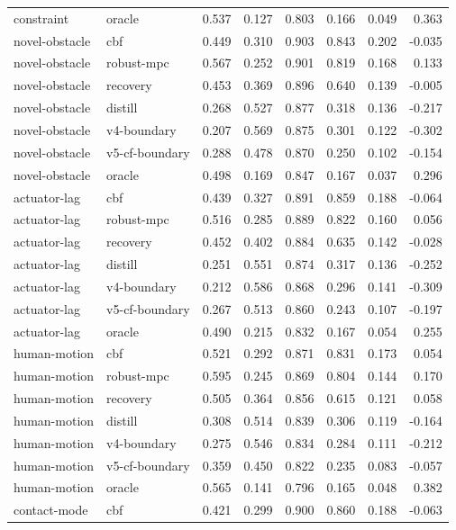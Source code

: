 \documentclass{article}
\begin{document}
\begin{longtable}{@{}llrrrrrr@{}}
constraint & oracle & 0.537 & 0.127 & 0.803 & 0.166 & 0.049 & 0.363 \\
novel-obstacle & cbf & 0.449 & 0.310 & 0.903 & 0.843 & 0.202 & -0.035 \\
novel-obstacle & robust-mpc & 0.567 & 0.252 & 0.901 & 0.819 & 0.168 & 0.133 \\
novel-obstacle & recovery & 0.453 & 0.369 & 0.896 & 0.640 & 0.139 & -0.005 \\
novel-obstacle & distill & 0.268 & 0.527 & 0.877 & 0.318 & 0.136 & -0.217 \\
novel-obstacle & v4-boundary & 0.207 & 0.569 & 0.875 & 0.301 & 0.122 & -0.302 \\
novel-obstacle & v5-cf-boundary & 0.288 & 0.478 & 0.870 & 0.250 & 0.102 & -0.154 \\
novel-obstacle & oracle & 0.498 & 0.169 & 0.847 & 0.167 & 0.037 & 0.296 \\
actuator-lag & cbf & 0.439 & 0.327 & 0.891 & 0.859 & 0.188 & -0.064 \\
actuator-lag & robust-mpc & 0.516 & 0.285 & 0.889 & 0.822 & 0.160 & 0.056 \\
actuator-lag & recovery & 0.452 & 0.402 & 0.884 & 0.635 & 0.142 & -0.028 \\
actuator-lag & distill & 0.251 & 0.551 & 0.874 & 0.317 & 0.136 & -0.252 \\
actuator-lag & v4-boundary & 0.212 & 0.586 & 0.868 & 0.296 & 0.141 & -0.309 \\
actuator-lag & v5-cf-boundary & 0.267 & 0.513 & 0.860 & 0.243 & 0.107 & -0.197 \\
actuator-lag & oracle & 0.490 & 0.215 & 0.832 & 0.167 & 0.054 & 0.255 \\
human-motion & cbf & 0.521 & 0.292 & 0.871 & 0.831 & 0.173 & 0.054 \\
human-motion & robust-mpc & 0.595 & 0.245 & 0.869 & 0.804 & 0.144 & 0.170 \\
human-motion & recovery & 0.505 & 0.364 & 0.856 & 0.615 & 0.121 & 0.058 \\
human-motion & distill & 0.308 & 0.514 & 0.839 & 0.306 & 0.119 & -0.164 \\
human-motion & v4-boundary & 0.275 & 0.546 & 0.834 & 0.284 & 0.111 & -0.212 \\
human-motion & v5-cf-boundary & 0.359 & 0.450 & 0.822 & 0.235 & 0.083 & -0.057 \\
human-motion & oracle & 0.565 & 0.141 & 0.796 & 0.165 & 0.048 & 0.382 \\
contact-mode & cbf & 0.421 & 0.299 & 0.900 & 0.860 & 0.188 & -0.063 \\

\end{longtable}
\end{document}
